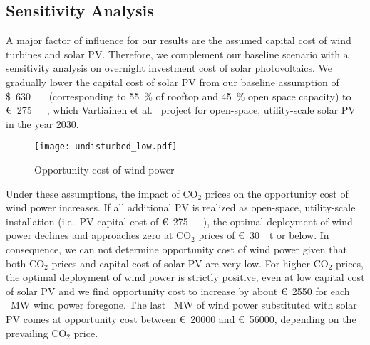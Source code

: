 \documentclass[review, 3p, times, 12pt]{elsarticle} %
\newcommand{\COO}{\ensuremath{\mathrm{CO_2}} }
\begin{document}
\subsection{Sensitivity Analysis} \label{subsec:sensitivity}
A major factor of influence for our results are the assumed capital cost of wind turbines and solar PV\@.
Therefore, we complement our baseline scenario with a sensitivity analysis on overnight investment cost of solar
photovoltaics.
We gradually lower the capital cost of solar PV from our baseline assumption of \SI{630}[\$]{\per\kilo\wattpeak}
(corresponding to \SI{55}{\percent} of rooftop and \SI{45}{\percent} open space capacity) to
\SI{275}[\euro]{\per\kilo\wattpeak}, which Vartiainen et al.~\cite{Vartiainen2019} project for open-space,
utility-scale solar PV in the year 2030.

\begin{figure*}[h!t]
\centering
\texttt{[image: undisturbed\_low.pdf]}
\caption{Opportunity cost of wind power}
\end{figure*}

Under these assumptions, the impact of \COO prices on the opportunity cost of wind power increases.
If all additional PV is realized as open-space, utility-scale installation (i.e.\ PV capital cost of
\SI{275}[\euro]{\per\kilo\wattpeak}), the optimal deployment of wind power declines and approaches zero at \COO prices
of \SI{30}[\euro]{\per\tonne} or below.
In consequence, we can not determine opportunity cost of wind power given that both \COO prices and capital cost of
solar PV are very low.
For higher \COO prices, the optimal deployment of wind power is strictly positive, even at low capital cost of solar
PV and we find opportunity cost to increase by about \SI{2550}[\euro]{} for each \SI{}{\mega\watt} wind power
foregone.
The last \SI{}{\mega\watt} of wind power substituted with solar PV comes at opportunity cost between
\SI{20000}[\euro]{} and \SI{56000}[\euro]{}, depending on the prevailing \COO price.
\end{document}
